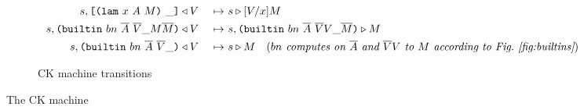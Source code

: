 \documentclass[../plutus-core-specification.tex]{subfiles}
\begin{document}
\begin{figure}[H]
\begin{subfigure}[c]{\linewidth}
\begin{minipage}{\linewidth}
\begin{alignat*}{2}
  s,\texttt{[} \texttt{(} \texttt{lam} ~ x ~ A ~ M \texttt{)} ~ \_ \texttt{]} &\triangleleft V
                                            &~\mapsto~&  s \triangleright [V/x]M\\
  s,\texttt{(} \texttt{builtin} ~ bn ~ \overline{A} ~ \overline{V} \_ M \overline{M} \texttt{)} & \triangleleft V
                                            &~\mapsto~& s,\texttt{(} \texttt{builtin} ~ bn ~ \overline{A} ~ \overline{V} V \_ \overline{M} \texttt{)} \triangleright M\\
  s,\texttt{(} \texttt{builtin} ~ bn ~ \overline{A} ~ \overline{V} \_  \texttt{)} &\triangleleft V
                                            &~\mapsto~& s \triangleright M
                                              \quad (\textit{$bn$ computes on $\overline{A}$ and $\overline{V}V$
                                              to $M$ according to Fig.~\ref{fig:builtins}})\\
    \end{alignat*}
\end{minipage}
    \caption{CK machine transitions}
    \label{fig:typed-ck-transitions}
\end{subfigure}
\caption{The CK machine}
\label{fig:typed-ck-machine}
\end{figure}
\end{document}
